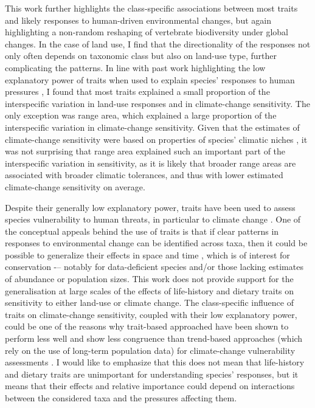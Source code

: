 This work further highlights the class-specific associations between most traits and likely responses to human-driven environmental changes, but again highlighting a non-random reshaping of vertebrate biodiversity under global changes. In the case of land use, I find that the directionality of the responses not only often depends on taxonomic class but also on land-use type, further complicating the patterns. In line with past work highlighting the low explanatory power of traits when used to explain species' responses to human pressures \citep{Angert2011, Verberk2013, Cannistra2021}, I found that most traits explained a small proportion of the interspecific variation in land-use responses and in climate-change sensitivity. The only exception was range area, which explained a large proportion of the interspecific variation in climate-change sensitivity. Given that the estimates of climate-change sensitivity were based on properties of species' climatic niches \citep{Rinnan2019}, it was not surprising that range area explained such an important part of the interspecific variation in sensitivity, as it is likely that broader range areas are associated with broader climatic tolerances, and thus with lower estimated climate-change sensitivity on average.

Despite their generally low explanatory power, traits have been used to assess species vulnerability to human threats, in particular to climate change \citep{Foden2013, Bohm2016}. One of the conceptual appeals behind the use of traits is that if clear patterns in responses to environmental change can be identified across taxa, then it could be possible to generalize their effects in space and time \citep{Verberk2013, Hamilton2020}, which is of interest for conservation -– notably for data-deficient species and/or those lacking estimates of abundance or population sizes. This work does not provide support for the generalisation at large scales of the effects of life-history and dietary traits on sensitivity to either land-use or climate change. The class-specific influence of traits on climate-change sensitivity, coupled with their low explanatory power, could be one of the reasons why trait-based approached have been shown to perform less well and show less congruence than trend-based approaches (which rely on the use of long-term population data) for climate-change vulnerability assessments \citep{Wheatley2017}. I would like to emphasize that this does not mean that life-history and dietary traits are unimportant for understanding species' responses, but it means that their effects and relative importance could depend on interactions between the considered taxa and the pressures affecting them.  

